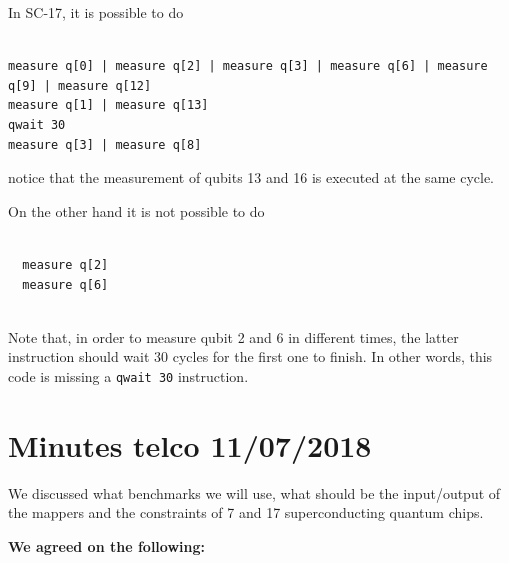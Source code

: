 \documentclass[11pt]{article}
\begin{document}
\begin{minipage}[t]{.45\textwidth}

In SC-17, it is possible to do

\begin{verbatim}
  
measure q[0] | measure q[2] | measure q[3] | measure q[6] | measure q[9] | measure q[12]
measure q[1] | measure q[13]
qwait 30
measure q[3] | measure q[8]

\end{verbatim}

notice that the measurement of qubits 13 and 16 is executed at the same cycle.     

\end{minipage}
\hfill %
\begin{minipage}[t]{.45\textwidth}

On the other hand it is not possible to do

\begin{verbatim}
  
  measure q[2]
  measure q[6]
  
\end{verbatim}

Note that, in order to measure qubit 2 and 6 in different times, the latter instruction should wait 30 cycles for the first one to finish. In other words, this code is missing a \texttt{qwait 30} instruction.

\end{minipage}












\section{Minutes telco 11/07/2018}

We discussed what benchmarks we will use, what should be the input/output of the mappers and the constraints of 7 and 17 superconducting quantum chips.

\textbf{We agreed on the following:}
\end{document}
